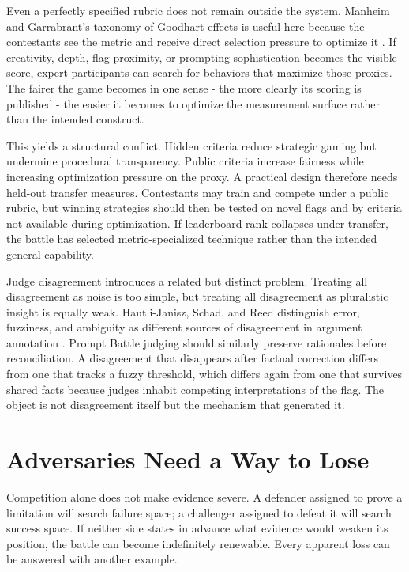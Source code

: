 \documentclass[11pt]{article}
\begin{document}
Even a perfectly specified rubric does not remain outside the system. Manheim and Garrabrant's taxonomy of Goodhart effects is useful here because the contestants see the metric and receive direct selection pressure to optimize it \cite{manheim2018goodhart}. If creativity, depth, flag proximity, or prompting sophistication becomes the visible score, expert participants can search for behaviors that maximize those proxies. The fairer the game becomes in one sense - the more clearly its scoring is published - the easier it becomes to optimize the measurement surface rather than the intended construct.

This yields a structural conflict. Hidden criteria reduce strategic gaming but undermine procedural transparency. Public criteria increase fairness while increasing optimization pressure on the proxy. A practical design therefore needs held-out transfer measures. Contestants may train and compete under a public rubric, but winning strategies should then be tested on novel flags and by criteria not available during optimization. If leaderboard rank collapses under transfer, the battle has selected metric-specialized technique rather than the intended general capability.

Judge disagreement introduces a related but distinct problem. Treating all disagreement as noise is too simple, but treating all disagreement as pluralistic insight is equally weak. Hautli-Janisz, Schad, and Reed distinguish error, fuzziness, and ambiguity as different sources of disagreement in argument annotation \cite{hautli2022disagreement}. Prompt Battle judging should similarly preserve rationales before reconciliation. A disagreement that disappears after factual correction differs from one that tracks a fuzzy threshold, which differs again from one that survives shared facts because judges inhabit competing interpretations of the flag. The object is not disagreement itself but the mechanism that generated it.

\section{Adversaries Need a Way to Lose}
Competition alone does not make evidence severe. A defender assigned to prove a limitation will search failure space; a challenger assigned to defeat it will search success space. If neither side states in advance what evidence would weaken its position, the battle can become indefinitely renewable. Every apparent loss can be answered with another example.
\end{document}
